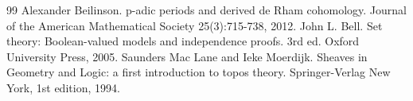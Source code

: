 \documentclass[10pt,a4paper]{amsart}
\begin{document}
\begin{thebibliography}{99}
 Alexander Beilinson. p-adic periods and derived de Rham cohomology. Journal of the American Mathematical Society 25(3):715-738, 2012.
 John L. Bell. Set theory: Boolean-valued models and independence proofs. 3rd ed. Oxford University Press, 2005.
 Saunders Mac Lane and Ieke Moerdijk. Sheaves in Geometry and Logic: a first introduction to topos theory. Springer-Verlag New York, 1st edition, 1994.
\end{thebibliography}
\end{document}
